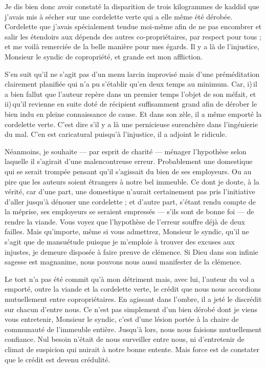 Je dis bien donc avoir constaté la disparition de trois kilogrammes de kaddid que j’avais mis à sécher sur une cordelette verte qui a elle même été dérobée. Cordelette que j’avais
spécialement tendue moi-même afin de ne pas encombrer et salir les étendoirs aux dépends des autres co-propriétaires, par respect pour tous ; et me voilà remerciée de la belle manière pour mes égards. Il y a là de l’injustice, Monsieur le syndic de copropriété, et grande est mon affliction.

S’en suit qu’il ne s’agit pas d’un menu larcin improvisé mais d’une préméditation clairement planifiée qui n’a pu s’établir qu’en deux temps au minimum. Car, i)\,il a bien fallut que l’auteur repère dans un premier temps l’objet de son méfait, et ii)\,qu’il revienne en suite doté de récipient suffisamment grand afin de dérober le bien indu en pleine connaissance de cause. Et dans son zèle, il a même emporté la cordelette verte. C’est dire s’il y a là une pernicieuse surenchère dans l’ingénierie du mal. C’en est caricatural puisqu’à l’injustice, il a adjoint le ridicule.

Néanmoins, je souhaite — par esprit de charité — ménager l’hypothèse selon laquelle il s’agirait d’une malencontreuse erreur. Probablement une domestique qui se serait trompée pensant qu’il s’agissait du bien de ses employeurs. Ou au pire que les auteurs soient étrangers à notre bel immeuble.
Ce dont je doute, à la vérité, car d’une part, une domestique n’aurait certainement pas pris l’initiative d’aller jusqu’à dénouer une cordelette ; et d’autre part, s’étant rendu compte de la méprise, ses employeurs se seraient empressés — s’ils sont de bonne foi — de rendre la viande. Vous voyez que l’hypothèse de l’erreur souffre déjà de deux failles. Mais qu’importe, même si
vous admettrez, Monsieur le syndic, qu’il ne s’agit que de mansuétude puisque je m’emploie à trouver des excuses aux injustes, je demeure disposée à faire preuve de clémence. Si Dieu dans son infinie sagesse est magnanime, nous pouvons nous aussi manifester de la clémence.


Le tort n’a pas été commit qu’à mon détriment mais, avec lui, l’auteur du vol a emporté, outre la viande et la cordelette verte, le crédit que nous nous accordions mutuellement entre copropriétaires. En agissant dans l’ombre, il a jeté le discrédit sur chacun d’entre nous.
Ce n’est pas simplement d’un bien dérobé dont je viens vous entretenir, Monsieur le syndic, c’est d’une lésion portée à la chaire de  communauté de l’immeuble entière.
Jusqu’à lors, nous nous faisions mutuellement confiance. Nul besoin n’était de nous surveiller entre nous, ni d’entretenir de climat de suspicion qui nuirait à notre bonne entente. Mais force est de constater que le crédit est devenu crédulité.

